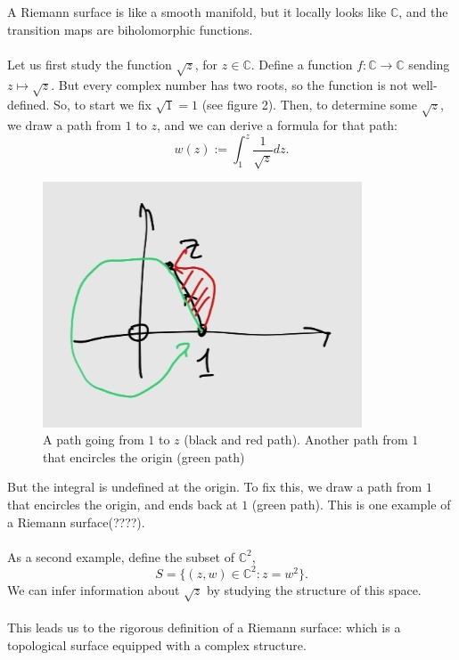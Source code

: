 \documentclass[a4paper]{report}
\theoremstyle{definition}
\theoremstyle{remark}
\theoremstyle{proposition}
\theoremstyle{conjecture}
\theoremstyle{lemma}
\theoremstyle{corollary}
\theoremstyle{exercise}
\theoremstyle{example}
\newcommand{\C}{\mathbb{C}}
\begin{document}
A Riemann surface is like a smooth manifold, but it locally looks like 
$\C$, and the transition maps are biholomorphic functions. \\\\
Let us first study the function $\sqrt{z}$, for $z\in \C$.
Define a function $f : \C\to\C$ sending $z\mapsto\sqrt{z}$. 
But every complex number has two roots, so the function is not well-defined. 
So, to start we fix $\sqrt{1} = 1$ (see figure 2). Then, to determine
some $\sqrt{z}$, we draw a path from $1$ to $z$, 
and we can derive a formula
for that path:
$$w(z) := \int_1^z \frac{1}{\sqrt{z}}dz.$$
\begin{figure}[h!]
    \centering
    \includegraphics[scale=0.5]{fig2.jpg}
    \caption{A path going from $1$ to $z$ (black and red path). Another path from $1$ that encircles the origin (green path)}
\end{figure}
But the integral is undefined at the origin. To fix this, we draw a path from
$1$ that encircles the origin, and ends back at $1$ (green path).
This is one example of a Riemann surface(????).\\\\
As a second example, define the subset of $\C^2$, 
$$S = \lbrace (z,w)\in\C^2 : z = w^2\rbrace.$$
We can infer information about $\sqrt{z}$ by studying the structure of this 
space. \\\\
This leads us to the rigorous definition of a Riemann surface: which is a 
topological surface equipped with a complex structure.
\end{document}
